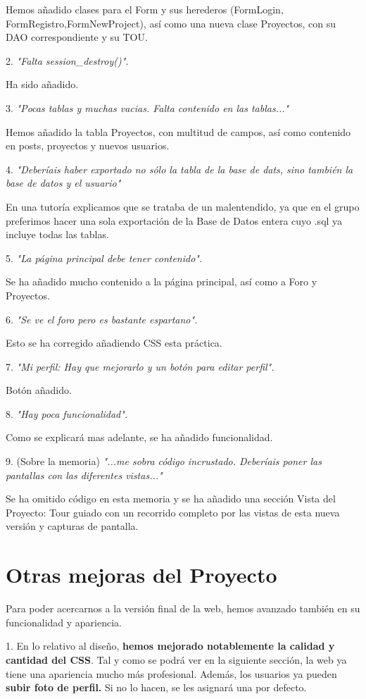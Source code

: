 \documentclass[12pt]{report}
\begin{document}
Hemos añadido clases para el Form y sus herederos (FormLogin, FormRegistro,FormNewProject), así como una nueva clase Proyectos, con su DAO correspondiente y su TOU.

2.  \textit{"Falta session\_destroy()".}

Ha sido añadido. 

3.  \textit{"Pocas tablas y muchas vacias. Falta contenido en las tablas..."}

Hemos añadido la tabla Proyectos, con multitud de campos, así como contenido en posts, proyectos y nuevos usuarios.

4.  \textit{"Deberíais haber exportado no sólo la tabla de la base de dats, sino también la base de datos y el usuario"}

En una tutoría explicamos que se trataba de un malentendido, ya que en el grupo preferimos hacer una sola exportación de la Base de Datos entera cuyo .sql ya incluye todas las tablas.

5.  \textit{"La página principal debe tener contenido".}

Se ha añadido mucho contenido a la página principal, así como a Foro y Proyectos.

6.  \textit{"Se ve el foro pero es bastante espartano".}

Esto se ha corregido añadiendo CSS esta práctica.

7. \textit{ "Mi perfil: Hay que mejorarlo y un botón para editar perfil".}

Botón añadido.

8.  \textit{"Hay poca funcionalidad".}

Como se explicará mas adelante, se ha añadido funcionalidad.

9. (Sobre la memoria)  \textit{"...me sobra código incrustado. Deberíais poner las pantallas con las diferentes vistas..."}

Se ha omitido código en esta memoria y se ha añadido una sección Vista del Proyecto: Tour guiado con un recorrido completo por las vistas de esta nueva versión y capturas de pantalla.

\section{Otras mejoras del Proyecto}

Para poder acercarnos a la versión final de la web, hemos avanzado también en su funcionalidad y apariencia.

1. En lo relativo al diseño, \textbf{hemos mejorado notablemente la calidad y cantidad del CSS}. Tal y como se podrá ver en la siguiente sección, la web ya tiene una apariencia mucho más profesional. Además, los usuarios ya pueden \textbf{subir foto de perfil.} Si no lo hacen, se les asignará una por defecto.
\end{document}
